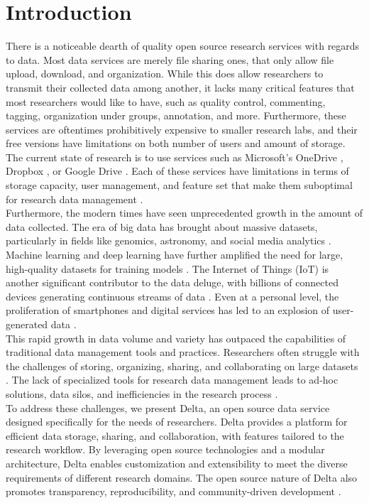 \documentclass[conference]{IEEEtran}
\begin{document}
\section{Introduction}
There is a noticeable dearth of quality open source research services with regards to data.
Most data services are merely file sharing ones, that only allow file upload, download, and organization.
While this does allow researchers to transmit their collected data among another,
it lacks many critical features that most researchers would like to have, such as
quality control, commenting, tagging, organization under groups, annotation, and more.
Furthermore, these services are oftentimes prohibitively expensive to smaller research labs, and their
free versions have limitations on both number of users and amount of storage.
The current state of research is to use services such as Microsoft's OneDrive \cite{onedrive}, Dropbox \cite{dropbox},
or Google Drive \cite{googledrive}. Each of these services have limitations in terms of storage capacity, user management,
and feature set that make them suboptimal for research data management \cite{kowalczyk2018data}.
\\
Furthermore, the modern times have seen unprecedented growth in the amount of data collected.
The era of big data has brought about massive datasets, particularly in fields like genomics, astronomy, and social media analytics \cite{stephens2015big}.
Machine learning and deep learning have further amplified the need for large, high-quality datasets for training models \cite{sun2017revisiting}.
The Internet of Things (IoT) is another significant contributor to the data deluge, with billions of connected devices generating continuous streams of data \cite{khan2018iot}.
Even at a personal level, the proliferation of smartphones and digital services has led to an explosion of user-generated data \cite{reinsel2018digitization}.
\\
This rapid growth in data volume and variety has outpaced the capabilities of traditional data management tools and practices.
Researchers often struggle with the challenges of storing, organizing, sharing, and collaborating on large datasets \cite{wallis2013if}.
The lack of specialized tools for research data management leads to ad-hoc solutions, data silos, and inefficiencies in the research process \cite{wilkinson2016fair}.
\\
To address these challenges, we present Delta, an open source data service designed specifically for the needs of researchers.
Delta provides a platform for efficient data storage, sharing, and collaboration, with features tailored to the research workflow.
By leveraging open source technologies and a modular architecture, Delta enables customization and extensibility to meet the diverse requirements of different research domains.
The open source nature of Delta also promotes transparency, reproducibility, and community-driven development \cite{gezelter2015open}.
\end{document}
